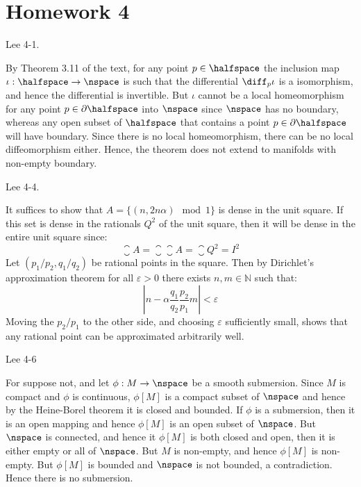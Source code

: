 \section{Homework 4}
    \begin{problem}
        Lee 4-1.
    \end{problem}
    \begin{solution}
        By Theorem 3.11 of the text, for any point $p\in\halfspace$ the
        inclusion map $\iota:\halfspace\rightarrow\nspace$ is such that the
        differential $\diff_{p}\iota$ is a isomorphism, and hence the
        differential is invertible. But $\iota$ cannot be a local
        homeomorphism for any point $p\in\partial\halfspace$ into
        $\nspace$ since $\nspace$ has no boundary, whereas any open subset
        of $\halfspace$ that contains a point $p\in\partial\halfspace$ will
        have boundary. Since there is no local homeomorphism, there can be
        no local diffeomorphism either. Hence, the theorem does not extend
        to manifolds with non-empty boundary.
    \end{solution}
    \begin{problem}
        Lee 4-4.
    \end{problem}
    \begin{solution}
        It suffices to show that $A=\{(n,2n\alpha)\mod{1}\}$ is dense in the
        unit square. If this set is dense in the rationals $Q^{2}$ of the
        unit square, then it will be dense in the entire unit square since:
        \begin{equation}
            \closure{A}=\closure{\closure{A}}=\closure{Q^{2}}=I^{2}
        \end{equation}
        Let $(p_{1}/p_{2},q_{1}/q_{2})$ be rational points in the square.
        Then by Dirichlet's approximation theorem for all $\varepsilon>0$
        there exists $n,m\in\mathbb{N}$ such that:
        \begin{equation}
            |n-\alpha\frac{q_{1}}{q_{2}}\frac{p_{2}}{p_{1}}m|<\varepsilon
        \end{equation}
        Moving the $p_{2}/p_{1}$ to the other side, and choosing
        $\varepsilon$ sufficiently small, shows that any rational point can
        be approximated arbitrarily well.
    \end{solution}
    \begin{problem}
        Lee 4-6
    \end{problem}
    \begin{solution}
        For suppose not, and let $\phi:M\rightarrow\nspace$ be a smooth
        submersion. Since $M$ is compact and $\phi$ is continuous,
        $\phi[M]$ is a compact subset of $\nspace$ and hence by the
        Heine-Borel theorem it is closed and bounded. If $\phi$ is a
        submersion, then it is an open mapping and hence $\phi[M]$ is an
        open subset of $\nspace$. But $\nspace$ is connected, and hence it
        $\phi[M]$ is both closed and open, then it is either empty or all of
        $\nspace$. But $M$ is non-empty, and hence $\phi[M]$ is non-empty.
        But $\phi[M]$ is bounded and $\nspace$ is not bounded, a
        contradiction. Hence there is no submersion.
    \end{solution}
